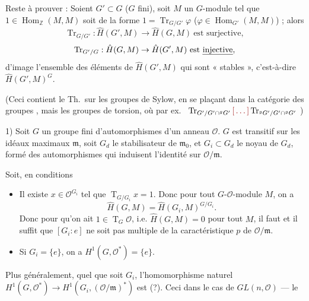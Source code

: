 \documentclass[11pt,a4paper]{article}
\begin{document}
Reste à prouver : Soient $G' \subset G$ ($G$ fini), soit $M$ un $G$-module
tel que $1 \in \operatorname{Hom}_{\mathbb{Z}}(M,M)$ soit de la forme
$1 = \operatorname{Tr}_{G/G'}\varphi$ \struck{\ill{}} ($\varphi \in
\operatorname{Hom}_{G'}(M,M)$) ; alors
\[
\operatorname{Tr}_{G/G'} : \hat{H}(G',M) \to \hat{H}(G,M)
\ \text{est surjective},
\]
\[
\operatorname{Tr}_{G'/G} : \hat{H}(G,M) \to \hat{H}(G',M)
\ \text{est \uncertain{injective}},
\]
d'image \ill{} l'ensemble des éléments de $\hat{H}(G',M)$ qui sont
« stables », c'est-à-dire $\hat{H}(G',M)^{G}$.

(Ceci contient le Th.\ sur les groupes de Sylow, \struck{\ill{}} \ill{} en
se plaçant dans la catégorie des groupes \ill{}, mais \ill{} les groupes de
torsion, où par ex.\ \ill{} \ill{}
$\operatorname{Tr}_{G'/G' \cap {}^{g}G'} \ill{}
\operatorname{Tr}_{{}^{g}G'/G' \cap {}^{g}G'}$ \ill{})


1) Soit $G$ un groupe fini d'automorphismes d'un anneau 
$\mathcal{O}$. $G$ est transitif sur les idéaux maximaux $\mathfrak{m}$,
soit $G_{d}$ le stabilisateur de $\mathfrak{m}_{0}$, et $G_{i} \subset
G_{d}$ le noyau \ill{} de $G_{d}$, formé des automorphismes qui induisent
l'identité sur $\mathcal{O}/\mathfrak{m}$.

Soit, en conditions
\begin{itemize}
\item[a)] Il existe $x \in \mathcal{O}^{G_{i}}$ tel que
$\operatorname{T}_{G/G_{i}} x = 1$. Donc pour tout $G$-$\mathcal{O}$-module
$M$, on a
\[
\hat{H}(G,M) = \hat{H}(G_{i},M)^{G/G_{i}} .
\]
Donc pour qu'on ait $1 \in \operatorname{T}_{G}\mathcal{O}$, i.e.
$\hat{H}(G,M) = 0$ pour tout $M$, il faut et il suffit que
$[G_{i} : e]$ ne soit pas multiple de la caractéristique $p$ de
$\mathcal{O}/\mathfrak{m}$.
\item[b)] Si $G_{i} = \{e\}$, on a $H^{1}(G, \mathcal{O}^{*}) = \{e\}$.
\end{itemize}

Plus généralement, quel que soit $G_{i}$, l'homomorphisme naturel
$H^{1}(G, \mathcal{O}^{*}) \to H^{1}(G_{i},
(\mathcal{O}/\mathfrak{m})^{*})$ est  (?). Ceci
\ill{} dans le cas de $GL(n,\mathcal{O})$ --- le \ill{}
\end{document}
